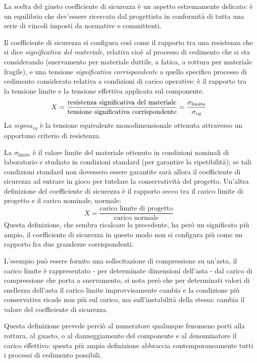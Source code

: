 \documentclass{article}
\begin{document}
\begin{adjustwidth}{2in}{}
	    La scelta del giusto coefficiente  di sicurezza è un aspetto estremamente delicato: è un equilibrio che dev'essere ricercato dal progettista in conformità di tutta una serie di vincoli imposti da normative e committenti. \newline
	    
	    Il coefficiente di sicurezza si configura così come il rapporto tra una resistenza che si dice  \textit{significativa del materiale}, relativa cioè al processo di cedimento che si sta considerando (snervamento per materiale duttile, a fatica, a rottura per materiale fragile), e una  tensione \textit{significativa corrispondente} a quello specifico processo di cedimento considerato relativa a condizioni di carico operative: è il rapporto tra la tensione limite e la tensione effettiva applicata sul componente. 
	    \[X = \dfrac{\text{resistenza significativa del materiale}}{\text{tensione significativa corrispondente}} = {\sigma_{\text{limite}}\over\sigma_{eq}}\]
	    La $sigma_{eq}$ è la tensione equivalente monodimensionale ottenuta attraverso un opportuno criterio di resistenza. 
	    
	    La $ \sigma_{\text{limite}} $ è il valore limite del materiale ottenuto in condizioni nominali di laboratorio e studiato in condizioni standard (per garantire la ripetibilità); se tali condizioni standard non dovessero essere garantite sarà allora il coefficiente di sicurezza ad entrare in gioco per tutelare la conservatività del progetto. 
\newpage	    	 
	    Un'altra definizione del coefficiente di sicurezza è il rapporto secco tra il carico limite di progetto e il carico nominale, normale:
	    \[X = \dfrac{\text{carico limite di progetto}}{\text{carico normale}}\]
	    Questa definizione, che sembra ricalcare la precedente, ha però un significato più ampio, il coefficiente di sicurezza in questo modo non si configura più come un rapporto fra due grandezze corrispondenti. 
	    
	    L'esempio può essere fornito una sollecitazione di compressione su un'asta, il carico limite è rappresentato - per determinate dimensioni dell'asta - dal carico di compressione che porta a snervamento, si nota però che per determinati valori di snellezza dell'asta il carico limite improvvisamente cambia e la condizione più conservativa ricade non più sul carico, ma sull'instabilità della stessa: cambia il valore del coefficiente  di sicurezza. 
	    
	    Questa definizione prevede perciò al numeratore qualunque fenomeno porti alla rottura, al guasto, o al danneggiamento del componente e al denominatore il carico effettivo: questa più ampia definizione abbraccia contemporaneamente tutti i processi di cedimento possibili. \newline	    
	    

\end{adjustwidth}
\end{document}
